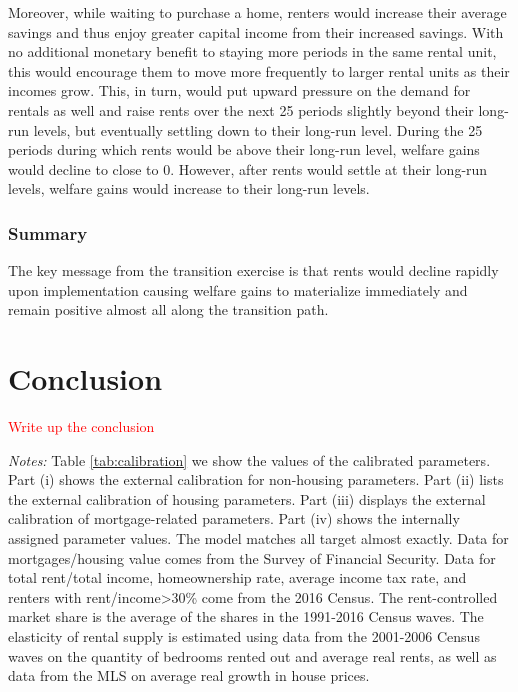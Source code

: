 \documentclass[parskip=full]{article}
\newenvironment{fignote2}[1]
{
\par
\medskip
\begin{minipage}{#1}
\footnotesize
}
{
\end{minipage}
}
\begin{document}
Moreover, while waiting to purchase a home, renters would increase their average savings and thus enjoy greater capital income from their increased savings. With no additional monetary benefit to staying more periods in the same rental unit, this would encourage them to move more frequently to larger rental units as their incomes grow. This, in turn, would put upward pressure on the demand for rentals as well and raise rents over the next 25 periods slightly beyond their long-run levels, but eventually settling down to their long-run level. During the 25 periods during which rents would be above their long-run level, welfare gains would decline to close to 0. However, after rents would settle at their long-run levels, welfare gains would increase to their long-run levels.

\subsubsection{Summary} The key message from the transition exercise is that rents would decline rapidly upon implementation causing welfare gains to materialize immediately and remain positive almost all along the transition path.

\section{Conclusion}\label{sec:conclusion}

\textcolor{red}{Write up the conclusion}



\linespread{1.5}

\begin{table}[H]
    \centering
    \caption{Assigned parameter values}
    \vspace{-0.5cm}
    \label{tab:calibration}
    
    \vspace{-0.45cm}
    \begin{fignote2}{1.07\textwidth}
    \textit{Notes:} Table \ref{tab:calibration} we show the values of the calibrated parameters. Part (i) shows the external calibration for non-housing parameters. Part (ii) lists the external calibration of housing parameters. Part (iii) displays the external calibration of mortgage-related parameters. Part (iv) shows the internally assigned parameter values. The model matches all target almost exactly. Data for mortgages/housing value comes from the Survey of Financial Security. Data for total rent/total income, homeownership rate, average income tax rate, and renters with rent/income>30\% come from the 2016 Census. The rent-controlled market share is the average of the shares in the 1991-2016 Census waves. The elasticity of rental supply is estimated using data from the 2001-2006 Census waves on the quantity of bedrooms rented out and average real rents, as well as data from the MLS on average real growth in house prices. 
    \end{fignote2}
\end{table}
\end{document}
